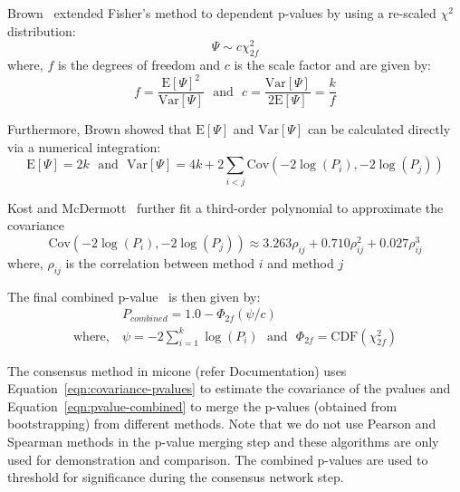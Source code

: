  Brown~\cite{brown_400_1975} extended Fisher's method to dependent p-values by using a re-scaled $\chi^2$ distribution:
  \begin{equation*}
    \Psi \sim c \chi^2_{2f}
  \end{equation*}
  where, $f$ is the degrees of freedom and $c$ is the scale factor and are given by:
  \begin{equation*}
    f = \frac{\mathrm{E}[\Psi]^2}{\mathrm{Var}[\Psi]} ~~~\text{and}~~~ c = \frac{\mathrm{Var}[\Psi]}{2\mathrm{E}[\Psi]} = \frac{k}{f}
  \end{equation*}

  Furthermore, Brown showed that $\mathrm{E}[\Psi]$ and $\mathrm{Var}[\Psi]$ can be calculated directly via a numerical integration:
  \begin{equation*}
    \mathrm{E}[\Psi] = 2k ~~~\text{and}~~~ \mathrm{Var}[\Psi] = 4k + 2\sum_{i<j} \mathrm{Cov}\left( -2\log(P_i), -2\log(P_j) \right)
  \end{equation*}

  Kost and McDermott~\cite{kost_combining_2002} further fit a third-order polynomial to approximate the covariance
  \begin{equation}
    \mathrm{Cov}\left( -2\log(P_i), -2\log(P_j) \right) \approx 3.263 \rho_{ij} + 0.710 \rho_{ij}^2 + 0.027 \rho_{ij}^3
    \label{eqn:covariance-pvalues}
  \end{equation}
  where, $\rho_{ij}$ is the correlation between method $i$ and method $j$

  The final combined p-value~\cite{Poole_Gibbs_Shmulevich_Bernard_Knijnenburg_2016} is then given by:
  \begin{equation}
    \begin{aligned}
        & P_{combined} = 1.0 - \Phi_{2f}\left( \psi / c \right) \\
        \text{where},~ &\psi = -2 \sum_{i=1}^k \log(P_i) ~~~\text{and}~~~ \Phi_{2f} = \mathrm{CDF}\left( \chi^2_{2f} \right)
    \end{aligned}
    \label{eqn:pvalue-combined}
  \end{equation}

  The consensus method in \ac{micone} (refer Documentation) uses Equation~\ref{eqn:covariance-pvalues} to estimate the covariance of the pvalues and Equation~\ref{eqn:pvalue-combined} to merge the p-values (obtained from bootstrapping) from different methods.
  Note that we do not use Pearson and Spearman methods in the p-value merging step and these algorithms are only used for demonstration and comparison.
  The combined p-values are used to threshold for significance during the consensus network step.

